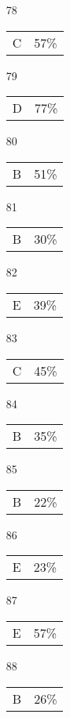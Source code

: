 \documentclass{article}
\begin{document}
\begin{multicols}{4}
\begin{enumerate}
    \item[78] \begin{tabular}{cc} C & 57\%\end{tabular}
    
    \item[79] \begin{tabular}{cc} D & 77\%\end{tabular}
    
    \item[80] \begin{tabular}{cc} B & 51\%\end{tabular}
    
       \item[]
    
    \item[81] \begin{tabular}{cc} B & 30\%\end{tabular}
    
    \item[82] \begin{tabular}{cc} E & 39\%\end{tabular}
    
    \item[83] \begin{tabular}{cc} C & 45\%\end{tabular}
    
    \item[84] \begin{tabular}{cc} B & 35\%\end{tabular}
    
    \item[85] \begin{tabular}{cc} B & 22\%\end{tabular}
    
       \item[]
    
    \item[86] \begin{tabular}{cc} E & 23\%\end{tabular}
    
    \item[87] \begin{tabular}{cc} E & 57\%\end{tabular}
    
    \item[88] \begin{tabular}{cc} B & 26\%\end{tabular}
    

\end{enumerate}
\end{multicols}
\end{document}
